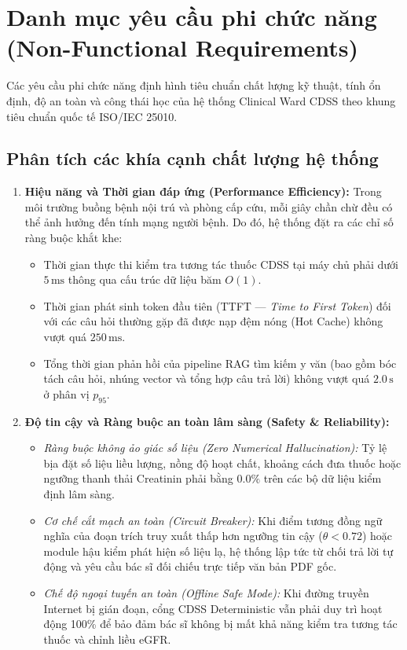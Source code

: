 \section{Danh mục yêu cầu phi chức năng (Non-Functional Requirements)}
\label{sec:nonfunctional_requirements}

Các yêu cầu phi chức năng định hình tiêu chuẩn chất lượng kỹ thuật, tính ổn định, độ an toàn và công thái học của hệ thống Clinical Ward CDSS theo khung tiêu chuẩn quốc tế ISO/IEC 25010.

\subsection{Phân tích các khía cạnh chất lượng hệ thống}
\label{subsec:nfr_aspects}

\begin{enumerate}[leftmargin=1.8em]
    \item \textbf{Hiệu năng và Thời gian đáp ứng (Performance Efficiency):} Trong môi trường buồng bệnh nội trú và phòng cấp cứu, mỗi giây chần chừ đều có thể ảnh hưởng đến tính mạng người bệnh. Do đó, hệ thống đặt ra các chỉ số ràng buộc khắt khe:
    \begin{itemize}
        \item Thời gian thực thi kiểm tra tương tác thuốc CDSS tại máy chủ phải dưới $5\,\text{ms}$ thông qua cấu trúc dữ liệu băm $O(1)$.
        \item Thời gian phát sinh token đầu tiên (TTFT --- \textit{Time to First Token}) đối với các câu hỏi thường gặp đã được nạp đệm nóng (Hot Cache) không vượt quá $250\,\text{ms}$.
        \item Tổng thời gian phản hồi của pipeline RAG tìm kiếm y văn (bao gồm bóc tách câu hỏi, nhúng vector và tổng hợp câu trả lời) không vượt quá $2.0\,\text{s}$ ở phân vị $p_{95}$.
    \end{itemize}

    \item \textbf{Độ tin cậy và Ràng buộc an toàn lâm sàng (Safety \& Reliability):}
    \begin{itemize}
        \item \textit{Ràng buộc không ảo giác số liệu (Zero Numerical Hallucination):} Tỷ lệ bịa đặt số liệu liều lượng, nồng độ hoạt chất, khoảng cách đưa thuốc hoặc ngưỡng thanh thải Creatinin phải bằng $0.0\%$ trên các bộ dữ liệu kiểm định lâm sàng.
        \item \textit{Cơ chế cắt mạch an toàn (Circuit Breaker):} Khi điểm tương đồng ngữ nghĩa của đoạn trích truy xuất thấp hơn ngưỡng tin cậy ($\theta < 0.72$) hoặc module hậu kiểm phát hiện số liệu lạ, hệ thống lập tức từ chối trả lời tự động và yêu cầu bác sĩ đối chiếu trực tiếp văn bản PDF gốc.
        \item \textit{Chế độ ngoại tuyến an toàn (Offline Safe Mode):} Khi đường truyền Internet bị gián đoạn, cổng CDSS Deterministic vẫn phải duy trì hoạt động 100\% để bảo đảm bác sĩ không bị mất khả năng kiểm tra tương tác thuốc và chỉnh liều eGFR.
    \end{itemize}


\end{enumerate}
